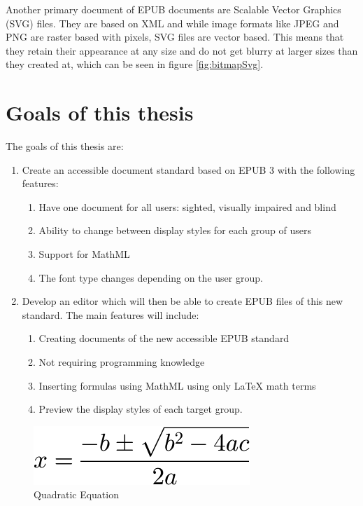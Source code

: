 Another primary document of EPUB documents are Scalable Vector Graphics (SVG) files. They are based on XML and while image formats like JPEG and PNG are raster based with pixels, SVG files are vector based. This means that they retain their appearance at any size and do not get blurry at larger sizes than they created at, which can be seen in figure \ref{fig:bitmapSvg}.


\section{Goals of this thesis}

The goals of this thesis are:

\begin{enumerate}
	\item Create an accessible document standard based on EPUB 3 with the following features:
	\begin{enumerate}
		\item Have one document for all users: sighted, visually impaired and blind
		\item Ability to change between display styles for each group of users
		\item Support for MathML
		\item The font type changes depending on the user group.
	\end{enumerate}
	\item Develop an editor which will then be able to create EPUB files of this new standard. The main features will include:
		\begin{enumerate}
		\item Creating documents of the new accessible EPUB standard 
		\item Not requiring programming knowledge
		\item Inserting formulas using MathML using only LaTeX math terms
		\item Preview the display styles of each target group. 
	\end{enumerate}
\end{enumerate}

\begin{figure}
	\begin{center}
		\includegraphics[width=\linewidth/3]{figures/QuadraticEquation.png}
	\end{center}
	\caption{Quadratic Equation}
	\label{fig:quadEquaPng}
\end{figure}

